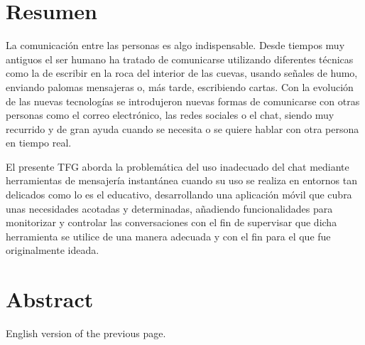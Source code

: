 \chapter{Resumen}
La comunicación entre las personas es algo indispensable. Desde tiempos muy antiguos el ser humano ha tratado de comunicarse  utilizando diferentes técnicas como la de escribir en la roca del interior de las cuevas, usando señales de humo, enviando palomas mensajeras o, más tarde, escribiendo cartas. Con la evolución de las nuevas tecnologías se introdujeron nuevas formas de comunicarse con otras personas como el correo electrónico, las redes sociales o el chat, siendo muy recurrido y de gran ayuda cuando se necesita o se quiere hablar con otra persona en tiempo real.

El presente \acf{TFG} aborda la problemática del uso inadecuado del chat mediante herramientas de mensajería instantánea cuando su uso se realiza en entornos tan delicados como lo es el educativo, desarrollando una aplicación móvil que cubra unas necesidades acotadas y determinadas, añadiendo funcionalidades para monitorizar y controlar las conversaciones con el fin de supervisar que dicha herramienta se utilice de una manera adecuada y con el fin para el que fue originalmente ideada.


\chapter{Abstract}

English version of the previous page.
